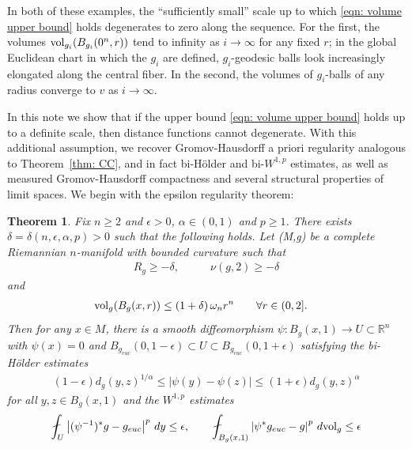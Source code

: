\documentclass[11pt,reqno]{amsart}
\newtheorem{theorem}{Theorem}[section]
\theoremstyle{remark}
\theoremstyle{definition}
\numberwithin{equation}{section}
\newcommand{\R}{{\mathbb{R}}}
\newcommand{\e}{{\epsilon}}
\newcommand{\vol}{{\rm{vol}}}
\begin{document}
  In both of these examples, the ``sufficiently small'' scale up to which \eqref{eqn: volume upper bound} holds degenerates to zero along the sequence. For the first, the volumes $\vol_{g_i}(B_{g_i}(0^n, r))$ tend to infinity as $i \to \infty$ for any fixed $r$; in the global Euclidean chart in which the $g_i$ are defined, $g_i$-geodesic balls look increasingly elongated along the central fiber.  In the second, the volumes of $g_i$-balls of any radius converge to $v$ as $i \to \infty.$  
  
In this note we show that if the upper bound \eqref{eqn: volume upper bound} holds up to a definite scale, then distance functions cannot degenerate. With this additional assumption, we recover  Gromov-Hausdorff a priori regularity analogous to Theorem~\ref{thm: CC}, and in fact bi-H\"{o}lder and bi-$W^{1,p}$ estimates,  as well as measured Gromov-Hausdorff compactness and several structural properties of limit spaces. We begin with the epsilon regularity theorem:


\begin{theorem}\label{thm: GH}
Fix $n \geqslant 2$ and $\e>0$, $\alpha \in (0,1)$ and $p\geq 1$. There exists $\delta=\delta(n, \e, \alpha, p)>0$ such that the following holds. 
 Let (M,g) be a complete Riemannian $n$-manifold with bounded curvature such that
\begin{align}
\label{e: scalar and entropy lower bound}
R_g \geq-\delta ,& \qquad \nu(g,2) \geq-\delta 
\end{align} 
and 
\begin{align}\label{en: vol upper bound theorem statement}
\vol_g(B_g(x, r)) \leq\left(1+\delta\right) \omega_n r^n& \qquad \forall r \in(0,2] .	
\end{align}
	 Then for any $x \in M$, 
	 there is a smooth diffeomorphism 
	 $\psi: B_g(x,1)\to U \subset \R^n$ with $\psi(x)=0$ and $B_{g_{euc}}(0,1-\e)\subset U\subset B_{g_{euc}}(0,1+\e)$ satisfying the bi-H\"{o}lder estimates 
	 	 \begin{align}\label{eqn: biholder ests th1}
	 	(1-\e)d_g(y,z)^{1/\alpha}\leq |\psi(y)-\psi(z)| \leq (1+\e)d_g(y,z)^\alpha
	 \end{align}
for all $y,z\in B_g(x,1)$ 	and the $W^{1,p}$ estimates
	 \begin{align}\label{eqn: w1p 1 intro}
  \fint_{U} \left|(\psi^{-1})^*g -g_{euc} \right|^p \, dy \leq \e, \qquad
 \fint_{B_g(x,1)} \left|\psi^* g_{euc} - g\right|^p \, d\vol_g \leq \e
	\end{align}
\end{theorem}
\end{document}
